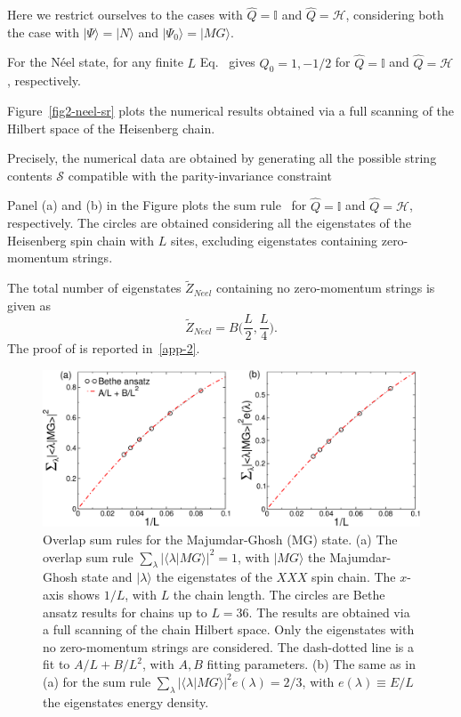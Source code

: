 \documentclass[11pt]{iopart}
\begin{document}
Here we restrict ourselves to the cases with $\hat Q=\mathbb{I}$ and $\hat 
Q={\mathcal H}$, considering both the case with $|\Psi\rangle=|N\rangle$ and 
$|\Psi_0\rangle=|MG\rangle$. 

For the N\'eel state, for any finite $L$ Eq.~ gives $Q_0=1,-1/2$ for 
$\hat{Q}=\mathbb{I}$ and $\hat Q={\mathcal H}$, respectively. 


Figure~\ref{fig2-neel-sr} plots the numerical results obtained via a full 
scanning of the Hilbert space of the Heisenberg chain. 

Precisely, the numerical data are obtained by generating all the possible string 
contents ${\mathcal S}$ compatible with the parity-invariance constraint

Panel (a) and (b) in the 
Figure plots the sum rule~ for $\hat Q=\mathbb{I}$ and $\hat Q={\mathcal 
H}$, respectively. The circles are obtained considering all the eigenstates of the 
Heisenberg spin chain with $L$ sites, excluding eigenstates containing 
zero-momentum strings. 

The total number of eigenstates $\widetilde Z_{Neel}$ containing no zero-momentum 
strings is given as 
%
\begin{equation}
\label{ztilde}
\widetilde Z_{Neel}=B\Big(\frac{L}{2},\frac{L}{4}\Big).
\end{equation}
%
The proof of is reported in~\ref{app-2}. 

\begin{figure}[t]
\begin{center}
\includegraphics[width=.9\textwidth]{./draft_figs/Dimer}
\end{center}
\caption{ Overlap sum rules for the Majumdar-Ghosh (MG) state. (a) The 
 overlap sum rule $\sum_{\lambda}|\langle\lambda|MG\rangle|^2=1$, 
 with $|MG\rangle$ the Majumdar-Ghosh state and $|\lambda\rangle$ 
 the eigenstates  of the $XXX$ spin chain. The $x$-axis shows $1/L$, 
 with $L$ the chain length. The circles are Bethe ansatz results for 
 chains up to $L=36$. The results are obtained via a full scanning of 
 the chain Hilbert space. Only the eigenstates with no zero-momentum 
 strings are considered. The dash-dotted line is a fit to $A/L+B/L^2$, 
 with $A,B$ fitting parameters. (b) The same as in (a) for the sum 
 rule $\sum_{\lambda}|\langle\lambda|MG\rangle|^2e(\lambda)=
 2/3$, with $e(\lambda)\equiv E/L$  the eigenstates energy density. 
}
\label{fig3-dimer-sr}
\end{figure}
\end{document}
